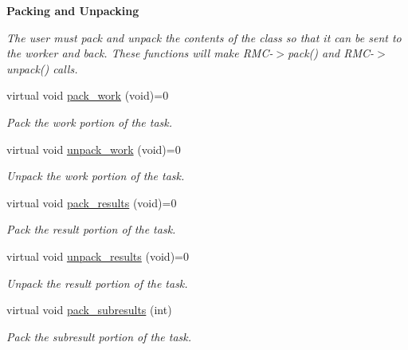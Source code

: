 \begin{Indent}\textbf{ Packing and Unpacking}\par
{\em The user must pack and unpack the contents of the class so that it can be sent to the worker and back. These functions will make R\+M\+C-\/$>$pack() and R\+M\+C-\/$>$unpack() calls. }\begin{DoxyCompactItemize}
\item 
\mbox{\label{classMWTask_a57073276fad38e58edda79d35021a52c}} 
virtual void \hyperlink{classMWTask_a57073276fad38e58edda79d35021a52c}{pack\+\_\+work} (void)=0
\begin{DoxyCompactList}\small\item\em Pack the work portion of the task. \end{DoxyCompactList}\item 
\mbox{\label{classMWTask_ac5802dedca5470a9a12cd2a6cdab17d3}} 
virtual void \hyperlink{classMWTask_ac5802dedca5470a9a12cd2a6cdab17d3}{unpack\+\_\+work} (void)=0
\begin{DoxyCompactList}\small\item\em Unpack the work portion of the task. \end{DoxyCompactList}\item 
\mbox{\label{classMWTask_a75f9ac3f76cbca33c6c8bd18ea3c0bab}} 
virtual void \hyperlink{classMWTask_a75f9ac3f76cbca33c6c8bd18ea3c0bab}{pack\+\_\+results} (void)=0
\begin{DoxyCompactList}\small\item\em Pack the result portion of the task. \end{DoxyCompactList}\item 
\mbox{\label{classMWTask_ab22e3eb9a27b8d115063e79067856166}} 
virtual void \hyperlink{classMWTask_ab22e3eb9a27b8d115063e79067856166}{unpack\+\_\+results} (void)=0
\begin{DoxyCompactList}\small\item\em Unpack the result portion of the task. \end{DoxyCompactList}\item 
\mbox{\label{classMWTask_a1a1b24e608337f787966b5d91f04f7de}} 
virtual void \hyperlink{classMWTask_a1a1b24e608337f787966b5d91f04f7de}{pack\+\_\+subresults} (int)
\begin{DoxyCompactList}\small\item\em Pack the subresult portion of the task. \end{DoxyCompactList}\item 

\end{DoxyCompactItemize}
\end{Indent}
